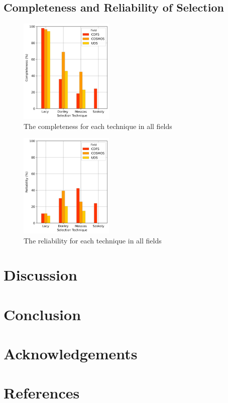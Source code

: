 \documentclass[12pt]{iopart}
\begin{document}
\subsection{Completeness and Reliability of Selection}
\begin{figure}[h]
  \centering
  \includegraphics[width=0.40\textwidth]{plots/TechniqueCompleteness.png}
  \caption{The completeness for each technique in all fields}
  \label{fig:Completeness}
\end{figure}
\begin{figure}[h]
  \centering
  \includegraphics[width=0.40\textwidth]{plots/TechniqueReliability.png}
  \caption{The reliability for each technique in all fields}
  \label{fig:Completeness}
\end{figure}

\newpage
\section{Discussion}
\section{Conclusion}
\section{Acknowledgements}
\newpage
\section{References}



\end{document}
